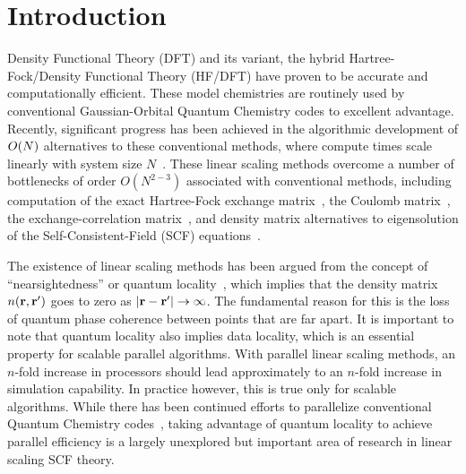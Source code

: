\commentoutA{\documentclass[prl,aps,twocolumn,showpacs,twocolumngrid,superbib]{revtex4}}
\begin{document}


\maketitle


\section{Introduction}
\label{sec:intro}
Density Functional Theory (DFT) and its variant, the hybrid
Hartree-Fock/Density Functional Theory (HF/DFT) have proven to be
accurate and computationally efficient.  These model chemistries are
routinely used by conventional Gaussian-Orbital Quantum Chemistry
codes to excellent advantage.  Recently, significant progress has been
achieved in the algorithmic development of ${\cal }O(N)$ alternatives
to these conventional methods, where compute times scale linearly with
system size $N$~\cite{Goedecker99,SWu02}.  These linear scaling methods
overcome a number of bottlenecks of order $O(N^{2-3})$ associated with
conventional methods, including computation of the exact Hartree-Fock
exchange matrix~\cite{ESchwegler96,ESchwegler97,ESchwegler98A,ESchwegler98C,ESchwegler99,ESchwegler00}, 
the Coulomb
matrix~\cite{CWhite94B,CWhite96A,MChallacombe96,MChallacombe96B,MStrain96,MChallacombe97},
the exchange-correlation
matrix~\cite{Jorda95,RStratmann96,CGuerra98,MChallacombe00A}, and
density matrix alternatives to eigensolution of the
Self-Consistent-Field (SCF) equations~\cite{XLi93,MDaw93,SQiu94,EHernandez95B,Hernandez96,CMGoringe97,ADaniels97,DBowler99B,APalser99,MChallacombe99,ANiklasson02A,ANiklasson02B}.

The existence of linear scaling methods has been argued from the
concept of ``nearsightedness'' or quantum
locality~\cite{WKohn95,WKohn96}, which implies that the density matrix
$n({\bf r},{\bf r'})$ goes to zero as $|{\bf r}-{\bf r}'| \rightarrow
\infty$. The fundamental reason for this is the loss of quantum phase
coherence between points that are far apart.  It is important to note
that quantum locality also implies data locality, which is an
essential property for scalable parallel algorithms.  With parallel
linear scaling methods, an $n$-fold increase in processors should lead
approximately to an $n$-fold increase in simulation capability.  In
practice however, this is true only for scalable algorithms.  While
there has been continued efforts to parallelize conventional Quantum
Chemistry codes~\cite{Harrison_94v45,Guerra_95,Sosa_98v19,Stephan_98v108,Furlani_00v128,Sosa_00v26,Yoshihiro_01v346,Baker_02v23,HTakashima02},
taking advantage of quantum locality to achieve parallel efficiency is
a largely unexplored but important area of research in linear scaling
SCF theory.
\end{document}
